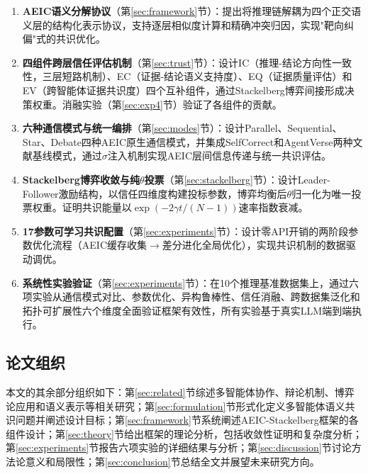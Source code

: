 \documentclass[12pt,a4paper,UTF8,fontset=fandol]{ctexart}
\begin{document}
\begin{enumerate}[nosep]
    \item \textbf{AEIC语义分解协议}（第\ref{sec:framework}节）：提出将推理链解耦为四个正交语义层的结构化表示协议，支持逐层相似度计算和精确冲突归因，实现"靶向纠偏"式的共识优化。

    \item \textbf{四组件跨层信任评估机制}（第\ref{sec:trust}节）：设计IC（推理-结论方向性一致性，三层短路机制）、EC（证据-结论语义支持度）、EQ（证据质量评估）和EV（跨智能体证据共识度）四个互补组件，通过Stackelberg博弈间接形成决策权重。消融实验（第\ref{sec:exp4}节）验证了各组件的贡献。

    \item \textbf{六种通信模式与统一编排}（第\ref{sec:modes}节）：设计Parallel、Sequential、Star、Debate四种AEIC原生通信模式，并集成SelfCorrect和AgentVerse两种文献基线模式，通过$\sigma$注入机制实现AEIC层间信息传递与统一共识评估。

    \item \textbf{Stackelberg博弈收敛与纯$\theta$投票}（第\ref{sec:stackelberg}节）：设计Leader-Follower激励结构，以信任四维度构建投标参数，博弈均衡后$\theta$归一化为唯一投票权重。证明共识能量以$\exp(-2\gamma t/(N-1))$速率指数衰减。

    \item \textbf{17参数可学习共识配置}（第\ref{sec:experiments}节）：设计零API开销的两阶段参数优化流程（AEIC缓存收集$\to$差分进化全局优化），实现共识机制的数据驱动调优。

    \item \textbf{系统性实验验证}（第\ref{sec:experiments}节）：在10个推理基准数据集上，通过六项实验从通信模式对比、参数优化、异构鲁棒性、信任消融、跨数据集泛化和拓扑可扩展性六个维度全面验证框架有效性，所有实验基于真实LLM端到端执行。
\end{enumerate}

\subsection{论文组织}

本文的其余部分组织如下：第\ref{sec:related}节综述多智能体协作、辩论机制、博弈论应用和语义表示等相关研究；第\ref{sec:formulation}节形式化定义多智能体语义共识问题并阐述设计目标；第\ref{sec:framework}节系统阐述AEIC-Stackelberg框架的各组件设计；第\ref{sec:theory}节给出框架的理论分析，包括收敛性证明和复杂度分析；第\ref{sec:experiments}节报告六项实验的详细结果与分析；第\ref{sec:discussion}节讨论方法论意义和局限性；第\ref{sec:conclusion}节总结全文并展望未来研究方向。
\end{document}
